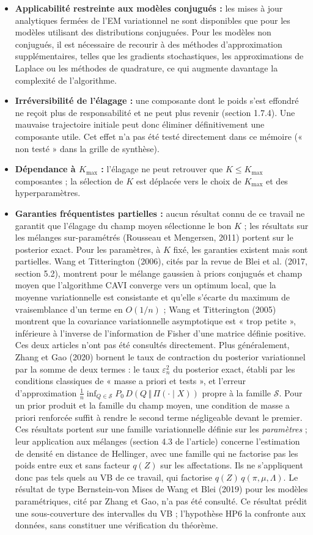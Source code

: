 \begin{itemize}
\item \textbf{Applicabilité restreinte aux modèles conjugués : }les mises à jour analytiques fermées de l'EM variationnel ne sont disponibles que pour les modèles utilisant des distributions conjuguées. Pour les modèles non conjugués, il est nécessaire de recourir à des méthodes d'approximation supplémentaires, telles que les gradients stochastiques, les approximations de Laplace ou les méthodes de quadrature, ce qui augmente davantage la complexité de l'algorithme.
\item \textbf{Irréversibilité de l'élagage : }une composante dont le poids s'est effondré ne reçoit plus de responsabilité et ne peut plus revenir (section 1.7.4). Une mauvaise trajectoire initiale peut donc éliminer définitivement une composante utile. Cet effet n'a pas été testé directement dans ce mémoire (« non testé » dans la grille de synthèse).
\item \textbf{Dépendance à $K_{\max}$ : }l'élagage ne peut retrouver que $K \leq K_{\max}$ composantes ; la sélection de $K$ est déplacée vers le choix de $K_{\max}$ et des hyperparamètres.
\item \textbf{Garanties fréquentistes partielles : }aucun résultat connu de ce travail ne garantit que l'élagage du champ moyen sélectionne le bon $K$ ; les résultats sur les mélanges sur-paramétrés (Rousseau et Mengersen, 2011) portent sur le posterior exact. Pour les paramètres, à $K$ fixé, les garanties existent mais sont partielles. Wang et Titterington (2006), cités par la revue de Blei et al. (2017, section 5.2), montrent pour le mélange gaussien à priors conjugués et champ moyen que l'algorithme CAVI converge vers un optimum local, que la moyenne variationnelle est consistante et qu'elle s'écarte du maximum de vraisemblance d'un terme en $O(1/n)$ ; Wang et Titterington (2005) montrent que la covariance variationnelle asymptotique est « trop petite », inférieure à l'inverse de l'information de Fisher d'une matrice définie positive. Ces deux articles n'ont pas été consultés directement. Plus généralement, Zhang et Gao (2020) bornent le taux de contraction du posterior variationnel par la somme de deux termes : le taux $\varepsilon_n^2$ du posterior exact, établi par les conditions classiques de « masse a priori et tests », et l'erreur d'approximation $\frac{1}{n}\inf_{Q \in \mathcal{S}} P_0\,D(Q \,\Vert\, \Pi(\cdot \mid X))$ propre à la famille $\mathcal{S}$. Pour un prior produit et la famille du champ moyen, une condition de masse a priori renforcée suffit à rendre le second terme négligeable devant le premier. Ces résultats portent sur une famille variationnelle définie sur les \emph{paramètres} ; leur application aux mélanges (section 4.3 de l'article) concerne l'estimation de densité en distance de Hellinger, avec une famille qui ne factorise pas les poids entre eux et sans facteur $q(Z)$ sur les affectations. Ils ne s'appliquent donc pas tels quels au VB de ce travail, qui factorise $q(Z)\,q(\pi, \mu, \Lambda)$. Le résultat de type Bernstein-von Mises de Wang et Blei (2019) pour les modèles paramétriques, cité par Zhang et Gao, n'a pas été consulté. Ce résultat prédit une sous-couverture des intervalles du VB ; l'hypothèse HP6 la confronte aux données, sans constituer une vérification du théorème.

\end{itemize}
